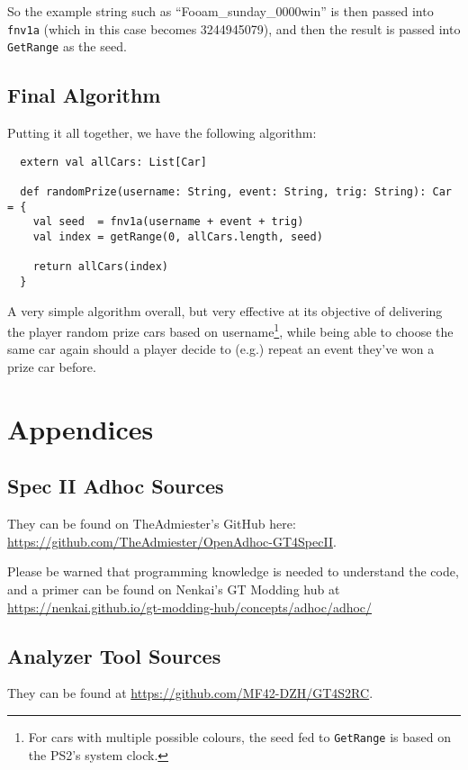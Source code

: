 \documentclass[14pt,a4paper,notitlepage]{extarticle}
\begin{document}
            \noindent So the example string such as ``Fooam\_sunday\_0000win'' is then passed
            into \texttt{fnv1a} (which in this case becomes 3244945079), and then the result is
            passed into \texttt{GetRange} as the seed.

        \subsection*{Final Algorithm}
            Putting it all together, we have the following algorithm:

            \begin{lstlisting}
  extern val allCars: List[Car]

  def randomPrize(username: String, event: String, trig: String): Car = {
    val seed  = fnv1a(username + event + trig)
    val index = getRange(0, allCars.length, seed)

    return allCars(index)
  }
            \end{lstlisting}

            \noindent A very simple algorithm overall, but very effective at its objective of
            delivering the player random prize cars based on username\footnote{For cars with
            multiple possible colours, the seed fed to \texttt{GetRange} is based on the PS2's
            system clock.}, while being able to choose the same car again should a player
            decide to (e.g.) repeat an event they've won a prize car before.

    \section*{Appendices}
        \subsection*{Spec II Adhoc Sources}
            They can be found on TheAdmiester's GitHub here:
            \url{https://github.com/TheAdmiester/OpenAdhoc-GT4SpecII}.

            Please be warned that programming knowledge is needed to
            understand the code, and a primer can be found on Nenkai's GT Modding hub at
            \url{https://nenkai.github.io/gt-modding-hub/concepts/adhoc/adhoc/}

        \subsection*{Analyzer Tool Sources}
            They can be found at \url{https://github.com/MF42-DZH/GT4S2RC}.
\end{document}
